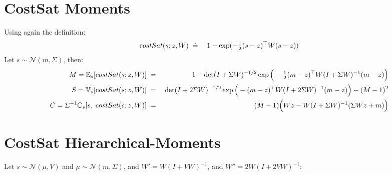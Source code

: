 \documentclass[a4paper,10pt]{article}
\newcommand{\C}{\mathbb{C}}
\newcommand{\E}{\mathbb{E}}
\newcommand{\V}{\mathbb{V}}
\newcommand{\N}{\mathcal{N}}
\newcommand{\inv}{^{-1}}
\newcommand{\T}{^{\top}}
\begin{document}
\section{CostSat Moments}

Using again the definition:
\begin{eqnarray}
 {\text costSat}(s;z,W) \;&\doteq&\; 1 - \exp(-\tfrac{1}{2}(s-z)\T W(s-z))
\end{eqnarray}
%
Let $s\sim\N(m,\Sigma)$, then:
%
\begin{eqnarray}
 M = \E_s[{\text costSat}(s;z,W)] &\;=\;& 1-\det(I+\Sigma W)^{-1/2} \exp\Big(-\tfrac{1}{2}(m-z)\T W (I+\Sigma W)\inv (m-z)\Big) \label{eq:E-exp-quad} \\
 S = \V_s[{\text costSat}(s;z,W)] &\;=\;& \det(I+2\Sigma W)^{-1/2}\exp\Big(-(m-z)\T W(I+2\Sigma W)\inv(m-z)\Big) - (M-1)^2 \\
 C = \Sigma\inv\C_s[s,\;{\text costSat}(s;z,W)] &\;=\;& (M-1)\Big(Wz - W(I+\Sigma W)\inv(\Sigma Wz+m)\Big)
\end{eqnarray}

\section{CostSat Hierarchical-Moments}

Let $s\sim\N(\mu,V)$ and $\mu\sim\N(m,\Sigma)$,
and $W' = W (I+V W)\inv$,
and $W'' = 2W (I+2V W)\inv$: %
\end{document}
